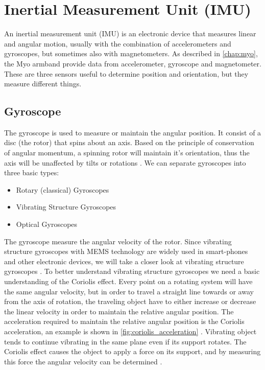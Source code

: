 \section{Inertial Measurement Unit (IMU)}
An inertial measurement unit (IMU) is an electronic device that measures linear and angular motion, usually with the combination of accelerometers and gyroscopes, but sometimes also with magnetometers. As described in \cref{chap:myo}, the Myo armband provide data from accelerometer, gyroscope and magnetometer. These are three sensors useful to determine position and orientation, but they measure different things.

\subsection{Gyroscope}
The gyroscope is used to measure or maintain the angular position. It consist of a disc (the rotor) that spins about an axis. Based on the principle of conservation of angular momentum, a spinning rotor will maintain it's orientation, thus the axis will be unaffected by tilts or rotations \cite{gyroscope_demonstration_project}. We can separate gyroscopes into three basic types:

\begin{itemize}
    \item Rotary (classical) Gyroscopes
    \item Vibrating Structure Gyroscopes
    \item Optical Gyroscopes
\end{itemize}

The gyroscope measure the angular velocity of the rotor. Since vibrating structure gyroscopes with MEMS technology are widely used in smart-phones and other electronic devices, we will take a closer look at vibrating structure gyroscopes \cite{vibrating_structure_gyroscope_wiki}. To better understand vibrating structure gyroscopes we need a basic understanding of the Coriolis effect. Every point on a rotating system will have the same angular velocity, but in order to travel a straight line towards or away from the axis of rotation, the traveling object have to either increase or decrease the linear velocity in order to maintain the relative angular position. The acceleration required to maintain the relative angular position is the Coriolis acceleration, an example is shown in \cref{fig:coriolis_acceleration} \cite{vibrating_structure_gyroscope}. Vibrating object tends to continue vibrating in the same plane even if its support rotates. The Coriolis effect causes the object to apply a force on its support, and by measuring this force the angular velocity can be determined \cite{vibrating_structure_gyroscope_wiki}.

